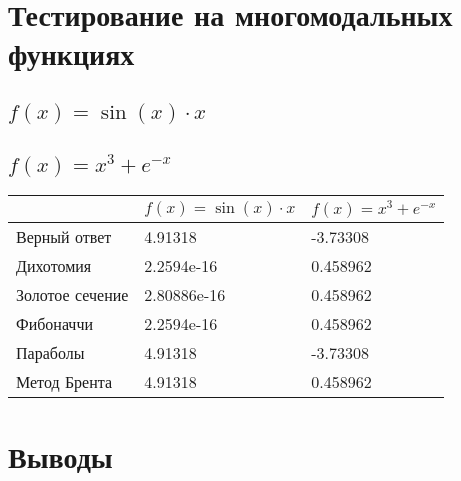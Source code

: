 
\section{Тестирование на многомодальных функциях}

\begin{multicols}{2}
\subsection{\(f(x) = \sin(x)\cdot x\)}


\subsection{\(f(x) = x^3 + e^{-x}\)}
\end{multicols}

\begin{tabular}{ | l | l | l | }
    \hline
                    & \(f(x) = \sin(x)\cdot x\) & \(f(x) = x^3 + e^{-x}\)\\ \hline
    Верный ответ    & 4.91318                   & -3.73308 \\ \hline
    Дихотомия       & 2.2594e-16                & 0.458962 \\ \hline
    Золотое сечение & 2.80886e-16               & 0.458962 \\ \hline
    Фибоначчи       & 2.2594e-16                & 0.458962 \\ \hline
    Параболы        & 4.91318                   & -3.73308 \\ \hline
    Метод Брента    & 4.91318                   & 0.458962 \\ \hline
\end{tabular}

\section{Выводы}

